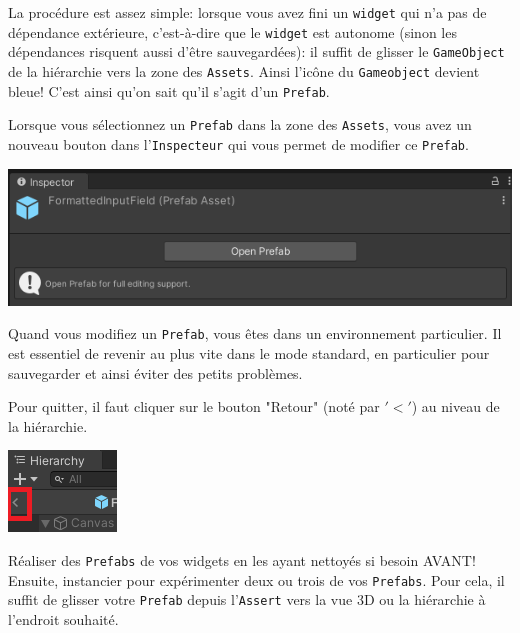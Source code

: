 \documentclass[a4paper,10pt]{article}
\newenvironment{info}%
{\begin{tcolorbox}[breakable,colback=green!5!white,colframe=green!75!black,title=Information]}%
{\end{tcolorbox}}
\newenvironment{attention}%
{\begin{tcolorbox}[breakable,colback=green!25!white,colframe=red!55!black,title=Attention]}%
{\end{tcolorbox}}
\begin{document}
La procédure est assez simple: lorsque vous avez fini un \texttt{widget} qui n'a pas de dépendance extérieure, c'est-à-dire que le \texttt{widget} est autonome (sinon les dépendances risquent aussi d'être sauvegardées): il suffit de glisser le \texttt{GameObject} de la hiérarchie vers la zone des \texttt{Assets}. Ainsi l'icône du \texttt{Gameobject} devient bleue! C'est ainsi qu'on sait qu'il s'agit d'un \texttt{Prefab}.


\begin{info}
Lorsque vous sélectionnez un \texttt{Prefab} dans la zone des \texttt{Assets}, vous avez un nouveau bouton dans l'\texttt{Inspecteur} qui vous permet de modifier ce \texttt{Prefab}.
\begin{center}
	\includegraphics[width=0.5\linewidth]{fig/unity_set_ui_open_prefab}
\end{center}
\end{info}

\begin{attention}
Quand vous modifiez un \texttt{Prefab}, vous êtes dans un environnement particulier. Il est essentiel de revenir au plus vite dans le mode standard, en particulier pour sauvegarder et ainsi éviter des petits problèmes. 

Pour quitter, il faut cliquer sur le bouton "Retour" (noté par $'<'$) au niveau de la hiérarchie.
\begin{center}
	\includegraphics[width=0.3\linewidth]{fig/unity_set_ui_close_prefab}
\end{center}
\end{attention}

Réaliser des \texttt{Prefabs} de vos widgets en les ayant nettoyés si besoin AVANT! Ensuite, instancier pour expérimenter deux ou trois de vos \texttt{Prefabs}. Pour cela, il suffit de glisser votre \texttt{Prefab} depuis l'\texttt{Assert} vers la vue 3D ou la hiérarchie à l'endroit souhaité.
\end{document}
